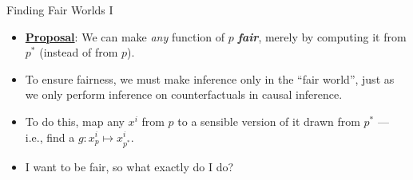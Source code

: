 \documentclass[12pt,t]{beamer}
\begin{document}
\begin{frame}[c]{Finding Fair Worlds I}

\begin{center}
\begin{itemize}
  \itemsep10pt
  \item \underline{\textbf{Proposal}}: We can make \textit{any} function of $p$
    \textbf{\textit{fair}}, merely by computing it from $p^*$ (instead of from
    $p$).
  \item To ensure fairness, we must make inference only in the ``fair world'',
    just as we only perform inference on counterfactuals in causal inference.
  \item To do this, map any $x^i$ from $p$ to a sensible version of it drawn
    from $p^*$ --- i.e., find a $g: x^i_{p} \mapsto x^i_{p^*}$.
  \item I want to be fair, so what exactly do I do?
\end{itemize}
\end{center}


\end{frame}

\end{document}
